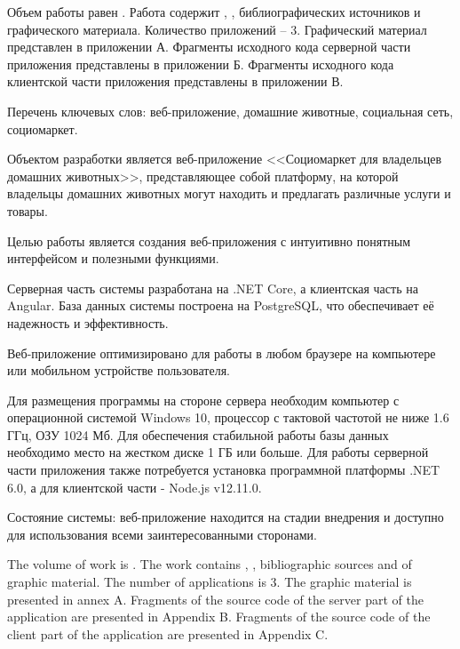 
Объем работы равен . Работа содержит , ,  библиографических источников и  графического материала. Количество приложений – 3. Графический материал представлен в приложении А. Фрагменты исходного кода серверной части приложения представлены в приложении Б. Фрагменты исходного кода клиентской части приложения представлены в приложении В.

Перечень ключевых слов: веб-приложение, домашние животные, социальная сеть, социомаркет.

Объектом разработки является веб-приложение <<Социомаркет для владельцев домашних животных>>, представляющее собой платформу, на которой владельцы домашних животных могут находить и предлагать различные услуги и товары.

Целью работы является создания веб-приложения с интуитивно понятным интерфейсом и полезными функциями.

Серверная часть системы разработана на .NET Core, а клиентская часть на Angular. База данных системы построена на PostgreSQL, что обеспечивает её надежность и эффективность.

Веб-приложение оптимизировано для работы в любом браузере на компьютере или мобильном устройстве пользователя.

Для размещения программы на стороне сервера необходим компьютер с операционной системой Windows 10, процессор с тактовой частотой не ниже 1.6 ГГц, ОЗУ 1024 Мб. Для обеспечения стабильной работы базы данных необходимо место на жестком диске 1 ГБ или больше. Для работы серверной части приложения также потребуется установка программной платформы .NET 6.0, а для клиентской части -\- Node.js v12.11.0.

Состояние системы: веб-приложение находится на стадии внедрения и доступно для использования всеми заинтересованными сторонами.

  
The volume of work is . The work contains , ,  bibliographic sources and  of graphic material. The number of applications is 3. The graphic material is presented in annex A. Fragments of the source code of the server part of the application are presented in Appendix B. Fragments of the source code of the client part of the application are presented in Appendix C.

